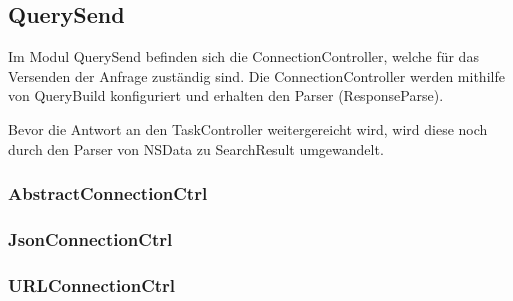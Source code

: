 
\subsection{QuerySend}

Im Modul QuerySend befinden sich die ConnectionController, welche für das Versenden der Anfrage zuständig sind. Die ConnectionController werden mithilfe von QueryBuild konfiguriert und erhalten den Parser (ResponseParse).

Bevor die Antwort an den TaskController weitergereicht wird, wird diese noch durch den Parser von NSData zu SearchResult umgewandelt.

\subsubsection{AbstractConnectionCtrl}
\subsubsection{JsonConnectionCtrl}
\subsubsection{URLConnectionCtrl}

